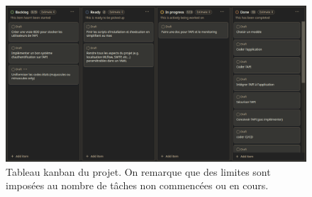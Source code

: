 \documentclass[french]{article}
\begin{document}
    \begin{figure}[h!]
        \includegraphics[width=12cm]{kanban}
        \centering
        \caption{Tableau kanban du projet. On remarque que des limites sont imposées au nombre de tâches non commencées ou en cours.}
        \centering
    \end{figure}
\end{document}
